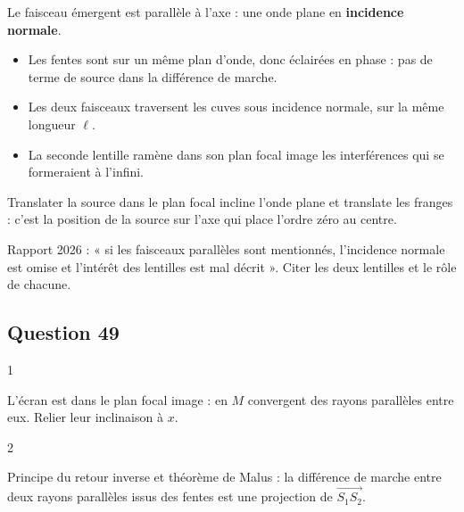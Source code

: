 \documentclass[11pt,a4paper]{article}
\providecommand{\tightlist}{\setlength{\itemsep}{0pt}\setlength{\parskip}{0pt}}
\begin{document}
Le faisceau émergent est parallèle à l'axe : une onde plane en \textbf{incidence normale}.

\begin{itemize}
\tightlist
\item
  Les fentes sont sur un même plan d'onde, donc éclairées en phase : pas de terme de source dans la différence de marche.
\item
  Les deux faisceaux traversent les cuves sous incidence normale, sur la même longueur \(\ell\).
\item
  La seconde lentille ramène dans son plan focal image les interférences qui se formeraient à l'infini.
\end{itemize}

\begin{piege}

Translater la source dans le plan focal incline l'onde plane et translate les franges : c'est la position de la source sur l'axe qui place l'ordre zéro au centre.

\end{piege}

\begin{jury}

Rapport 2026 : « si les faisceaux parallèles sont mentionnés, l'incidence normale est omise et l'intérêt des lentilles est mal décrit ». Citer les deux lentilles et le rôle de chacune.

\end{jury}

\hypertarget{question-49}{%
\subsection{Question 49}\label{question-49}}

\begin{indication}{1}

L'écran est dans le plan focal image : en \(M\) convergent des rayons parallèles entre eux. Relier leur inclinaison à \(x\).

\end{indication}

\begin{indication}{2}

Principe du retour inverse et théorème de Malus : la différence de marche entre deux rayons parallèles issus des fentes est une projection de \(\overrightarrow{S_1S_2}\).

\end{indication}
\end{document}
